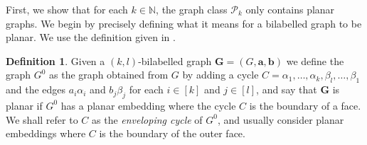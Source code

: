 \documentclass[a4paper,onecolumn,11pt,accepted=2026-01-06]{quantumarticle}
\theoremstyle{plain}
\theoremstyle{remark}
\theoremstyle{definition}
\newtheorem{definition}[thm]{Definition}
\def\calP{{\mathcal P}} \def\calQ{{\mathcal Q}} \def\calR{{\mathcal R}}
\begin{document}
First, we show that for each $k \in \mathbb{N}$, the graph class $\calP_k$ only contains planar graphs. We begin by precisely defining what it means for a bilabelled graph to be planar. We use the definition given in \cite{david-laura}. 

\begin{definition}
    Given a $(k,l)$-bilabelled graph $\boldsymbol{G} = (G, \boldsymbol{a}, \boldsymbol{b})$ we define the graph $G^0$ as the graph obtained from $G$ 
    by adding a cycle $C = \alpha_1, \dots, \alpha_k, \beta_l, \dots , \beta_1$ 
    and the edges $a_i\alpha_i$ and $b_j\beta_j$ for each $i \in [k]$ and $j \in [l]$, and say that $\boldsymbol{G}$ is planar if $G^{0}$ has a planar embedding where the cycle $C$ is the boundary of a face. We shall refer to $C$ as the \emph{enveloping cycle} of $G^0$, and usually consider planar embeddings where $C$ is the boundary of the outer face.%
\end{definition}
\end{document}
